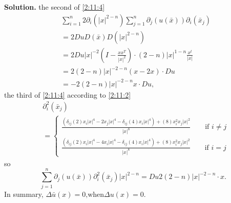 \documentclass[a4paper]{book}
\newenvironment{solution}%
{\noindent\textbf{Solution.}}%
{\qedhere}
\numberwithin{equation}{chapter}
\theoremstyle{definition}
\begin{document}
\begin{multicols}{2}
\begin{solution}
	the second of \ref{2:11:4}
	\begin{equation}
	\begin{aligned} 
		&\sum_{i = 1}^{n} 2\partial_i(|x|^{2-n})\sum_{j = 1}^{n}\partial_j (u(\bar{x}))\partial_i(\bar{x}_j) \\
		&= 2 Du D(\bar{x}) D(|x|^{2-n}) \\
		&= 2 Du |x|^{-2}(I - \frac{xx^T}{|x|^2}) \cdot (2-n)|x|^{1-n}\frac{x^t}{|x|} \\
		&= 2(2-n)|x|^{-2-n}(x - 2x) \cdot Du \\
		&= -2(2-n)|x|^{-2-n} x \cdot Du,
	\end{aligned} 
	\end{equation}
	the third of \ref{2:11:4} according to \ref{2:11:2} 
	\begin{equation}
		\begin{aligned}
		&\partial_i^2(\bar{x}_j) \\
		&=\begin{cases}
		\frac{(\delta_{ij} (2) x_i |x|^4 - 2x_j |x|^4 - \delta_{ij} (4) x_i |x|^4) + (8)x_i^2 x_j |x|^2}{|x|^8} \qquad \text{if } i \neq j \\
		\frac{(\delta_{ij} (2) x_i |x|^4 - 4x_i |x|^4 - \delta_{ij} (4) x_i |x|^4) + (8)x_i^2 x_j |x|^2}{|x|^8} \qquad \text{if } i = j 
		\end{cases} 
		\end{aligned}
	\end{equation}
	so 
	\begin{equation}
		\sum_{j = 1}^{n}\partial_j (u(\bar{x})) \partial_i^2(\bar{x}_j)|x|^{2-n}
		= Du 2(2-n) |x|^{-2-n} \cdot x.
	\end{equation}
	In summary, $\Delta \bar{u}(x) = 0 \text{,when} \Delta u(x) = 0$. 
\end{solution}
%



\end{multicols}
\end{document}
